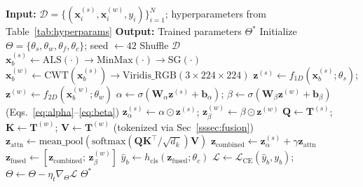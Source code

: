 \documentclass[preprint,12pt]{elsarticle}
\begin{document}
\begin{algorithm}[!t]
\caption{End-to-end training of SDR-Fusion}
\label{alg:training}
\begin{algorithmic}[1]
  \State \textbf{Input:}
         $\mathcal{D}=\{(\mathbf{x}_i^{(s)},\mathbf{x}_i^{(w)},
         y_i)\}_{i=1}^N$;
         hyperparameters from Table~\ref{tab:hyperparams}
  \State \textbf{Output:} Trained parameters $\Theta^*$
  \State Initialize $\Theta=\{\theta_s,\theta_w,\theta_f,\theta_c\}$;
         seed $\leftarrow 42$
    \State Shuffle $\mathcal{D}$
      \State $\mathbf{x}_b^{(s)}\leftarrow
              \mathrm{ALS}(\cdot){\to}\mathrm{MinMax}(\cdot)
              {\to}\mathrm{SG}(\cdot)$
      \State $\mathbf{x}_b^{(w)}\leftarrow
              \mathrm{CWT}(\mathbf{x}_b^{(s)}){\to}
              \mathrm{Viridis\_RGB}(3{\times}224{\times}224)$
      \State $\mathbf{z}^{(s)}\leftarrow
              f_{1D}(\mathbf{x}_b^{(s)};\theta_s)$;\;
              $\mathbf{z}^{(w)}\leftarrow
              f_{2D}(\mathbf{x}_b^{(w)};\theta_w)$
      \State $\alpha\leftarrow
              \sigma(\mathbf{W}_\alpha\mathbf{z}^{(s)}{+}
              \mathbf{b}_\alpha)$;\;
              $\beta\leftarrow
              \sigma(\mathbf{W}_\beta\mathbf{z}^{(w)}{+}
              \mathbf{b}_\beta)$
              \hfill{\small(Eqs.~\ref{eq:alpha}--\ref{eq:beta})}
      \State $\mathbf{z}_\alpha^{(s)}\leftarrow
              \alpha\odot\mathbf{z}^{(s)}$;\;
              $\mathbf{z}_\beta^{(w)}\leftarrow
              \beta\odot\mathbf{z}^{(w)}$
      \State $\mathbf{Q}{\leftarrow}\mathbf{T}^{(s)}$;\;
              $\mathbf{K}{\leftarrow}\mathbf{T}^{(w)}$;\;
              $\mathbf{V}{\leftarrow}\mathbf{T}^{(w)}$
              \hfill{\small(tokenized via
              Sec~\ref{sssec:fusion})}
      \State $\mathbf{z}_\mathrm{attn}\leftarrow
              \mathrm{mean\_pool}(
              \mathrm{softmax}(\mathbf{Q}\mathbf{K}^\top/
              \sqrt{d_k})\mathbf{V})$
      \State $\mathbf{z}_\mathrm{combined}\leftarrow
              \mathbf{z}_\alpha^{(s)}{+}\gamma\mathbf{z}_\mathrm{attn}$
      \State $\mathbf{z}_\mathrm{fused}\leftarrow
              [\mathbf{z}_\mathrm{combined};\,
              \mathbf{z}_\beta^{(w)}]$
      \State $\hat{y}_b\leftarrow
              h_\mathrm{cls}(\mathbf{z}_\mathrm{fused};\theta_c)$
      \State $\mathcal{L}\leftarrow
              \mathcal{L}_\mathrm{CE}(\hat{y}_b,y_b)$;\;
              $\Theta\leftarrow\Theta{-}\eta_t\nabla_\Theta\mathcal{L}$
    \EndFor
  \EndFor
  \State \Return $\Theta^*$
\end{algorithmic}
\end{algorithm}
\end{document}
